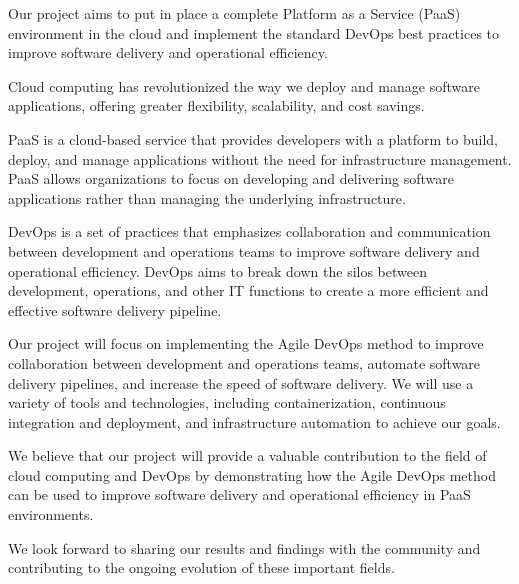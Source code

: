 \pagestyle{fancy}
\fancyhead[L]{\ungaramond\small\textbf{}}
\fancyhead[C]{}
\fancyhead[R]{\ungaramond\small\textbf{}}
\fancyfoot[C]{}
\renewcommand{\headrulewidth}{1.7pt}
\renewcommand{\headrule}{\hbox to\headwidth{\color{gray}\leaders\hrule height \headrulewidth\hfill}}
\renewcommand{\footrulewidth}{1.7pt}
\renewcommand{\footrule}{\hbox to\headwidth{\color{gray}\leaders\hrule height \footrulewidth\hfill}}
\begin{center}

\end{center}
\vspace{0.8cm}
\setcounter{page}{1}


Our project aims to put in place a complete Platform as a Service (PaaS) environment in the cloud and implement the standard DevOps best practices to improve software delivery and operational efficiency. 

Cloud computing has revolutionized the way we deploy and manage software applications, offering greater flexibility, scalability, and cost savings. 

PaaS is a cloud-based service that provides developers with a platform to build, deploy, and manage applications without the need for infrastructure management. PaaS allows organizations to focus on developing and delivering software applications rather than managing the underlying infrastructure. 

DevOps is a set of practices that emphasizes collaboration and communication between development and operations teams to improve software delivery and operational efficiency. DevOps aims to break down the silos between development, operations, and other IT functions to create a more efficient and effective software delivery pipeline. 

Our project will focus on implementing the Agile DevOps method to improve collaboration between development and operations teams, automate software delivery pipelines, and increase the speed of software delivery. We will use a variety of tools and technologies, including containerization, continuous integration and deployment, and infrastructure automation to achieve our goals. 

We believe that our project will provide a valuable contribution to the field of cloud computing and DevOps by demonstrating how the Agile DevOps method can be used to improve software delivery and operational efficiency in PaaS environments. 

We look forward to sharing our results and findings with the community and contributing to the ongoing evolution of these important fields.
